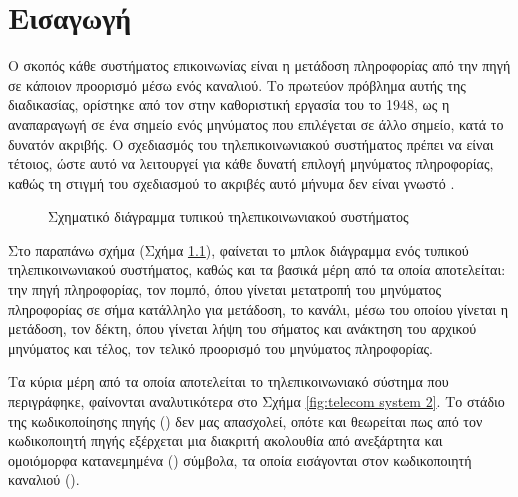\chapter{Εισαγωγή}
Ο σκοπός κάθε συστήματος επικοινωνίας είναι η μετάδοση πληροφορίας από την πηγή σε κάποιον προορισμό μέσω ενός καναλιού. Το πρωτεύον πρόβλημα αυτής της διαδικασίας, ορίστηκε από τον  στην καθοριστική εργασία του το 1948, ως η αναπαραγωγή σε ένα σημείο ενός μηνύματος που επιλέγεται σε άλλο σημείο, κατά το δυνατόν ακριβής. Ο σχεδιασμός του τηλεπικοινωνιακού συστήματος πρέπει να είναι τέτοιος, ώστε αυτό να λειτουργεί για κάθε δυνατή επιλογή μηνύματος πληροφορίας, καθώς τη στιγμή του σχεδιασμού το ακριβές αυτό μήνυμα δεν είναι γνωστό \cite{shannon1948mathematical}.

\begin{figure}[h]
\caption{Σχηματικό διάγραμμα τυπικού τηλεπικοινωνιακού συστήματος}
\label{fig:telecom system}
\end{figure}

Στο παραπάνω σχήμα (Σχήμα \ref{fig:telecom system}), φαίνεται το μπλοκ διάγραμμα ενός τυπικού τηλεπικοινωνιακού συστήματος, καθώς και τα βασικά μέρη από τα οποία αποτελείται: την πηγή πληροφορίας, τον πομπό, όπου γίνεται μετατροπή του μηνύματος πληροφορίας σε σήμα κατάλληλο για μετάδοση, το κανάλι, μέσω του οποίου γίνεται η μετάδοση, τον δέκτη, όπου γίνεται λήψη του σήματος και ανάκτηση του αρχικού μηνύματος και τέλος, τον τελικό προορισμό του μηνύματος πληροφορίας.

Tα κύρια μέρη από τα οποία αποτελείται το τηλεπικοινωνιακό σύστημα που περιγράφηκε, φαίνονται αναλυτικότερα στο Σχήμα \ref{fig:telecom system 2}. Tο στάδιο της κωδικοποίησης πηγής () δεν μας απασχολεί, οπότε και θεωρείται πως από τον κωδικοποιητή πηγής εξέρχεται μια διακριτή ακολουθία από ανεξάρτητα και ομοιόμορφα κατανεμημένα () σύμβολα, τα οποία εισάγονται στον κωδικοποιητή καναλιού ().

